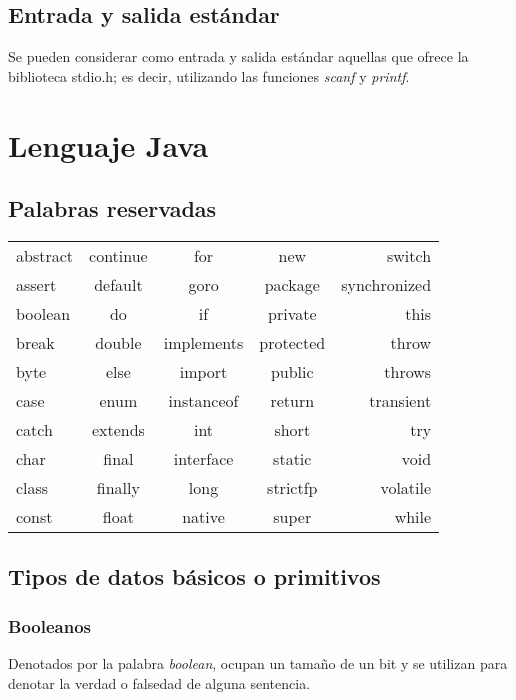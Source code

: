 \documentclass[12pt]{article}
\begin{document}
\subsection{Entrada y salida est\'andar}

Se pueden considerar como entrada y salida est\'andar aquellas que ofrece la biblioteca stdio.h; es decir, utilizando las funciones \textit{scanf} y \textit{printf}.

\section{Lenguaje Java}

\subsection{Palabras reservadas}

\begin{center}
\begin{tabular}{lcccr}

abstract & continue & for & new & switch \\
assert & default & goro & package & synchronized \\
boolean & do & if & private & this \\
break & double & implements & protected & throw \\
byte & else & import & public & throws \\
case & enum & instanceof & return & transient \\
catch & extends & int & short & try \\
char & final & interface & static & void \\
class & finally & long & strictfp & volatile \\
const & float & native & super & while \\

\end{tabular}
\end{center}

\subsection{Tipos de datos b\'asicos o primitivos}

\subsubsection{Booleanos}

Denotados por la palabra \textit{boolean}, ocupan un tama\~no de un bit y se utilizan para denotar la verdad o falsedad de alguna sentencia.
\end{document}
